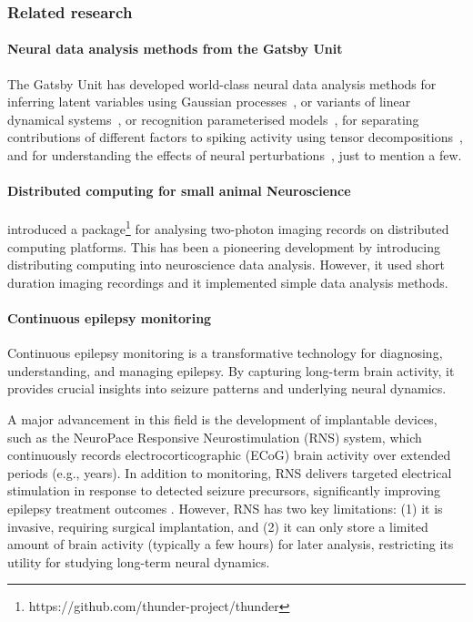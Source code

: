 \documentclass[12pt]{article}
\begin{document}
\subsubsection{Related research}
\label{sec:relatedResearchOfflineAnalysis}

\paragraph{Neural data analysis methods from the Gatsby Unit}
%
The Gatsby Unit has developed world-class neural data analysis methods for
%
inferring latent variables using Gaussian
processes~\citep{yuEtAl09,dunckerAndSahani18,ruttenEtAl20,yuEtAl24}, or variants
of linear dynamical systems~\citep{buesinEtAl12,mackeEtAl15}, or recognition
parameterised models~\citep{walkerEtAl23},
%
for separating contributions of different factors to spiking activity using
tensor decompositions~\citep{soulatEtAl21},
%
and for understanding the effects of neural perturbations~\citep{oSheaEtAl22},
just to mention a few.

\paragraph{Distributed computing for small animal Neuroscience}
%
\citet{freemanEtAl14} introduced a
package\footnote{https://github.com/thunder-project/thunder} for analysing
two-photon imaging records on distributed computing platforms.  This has been a
pioneering development by introducing distributing computing into neuroscience
data analysis. However, it used short duration imaging recordings and it
implemented simple data analysis methods.

\paragraph{Continuous epilepsy monitoring}
%
Continuous epilepsy monitoring is a transformative technology for diagnosing,
understanding, and managing epilepsy. By capturing long-term brain activity, it
provides crucial insights into seizure patterns and underlying neural dynamics.

A major advancement in this field is the development of implantable devices,
such as the NeuroPace Responsive Neurostimulation (RNS) system, which
continuously records electrocorticographic (ECoG) brain activity over extended
periods (e.g., years). In addition to monitoring, RNS delivers targeted
electrical stimulation in response to detected seizure precursors,
significantly improving epilepsy treatment outcomes \citep{rao21}. However, RNS
has two key limitations: (1) it is invasive, requiring surgical implantation,
and (2) it can only store a limited amount of brain activity (typically a few
hours) for later analysis, restricting its utility for studying long-term
neural dynamics.
\end{document}
